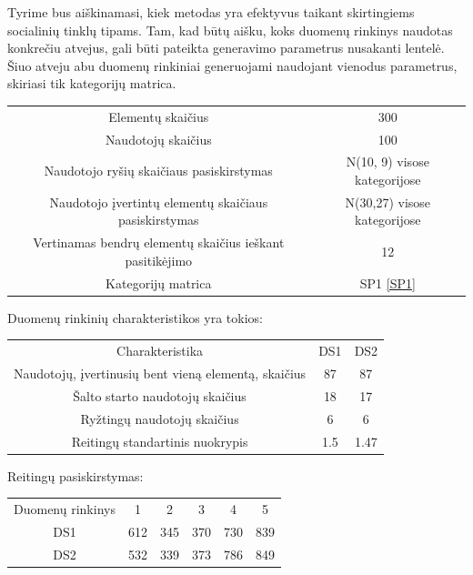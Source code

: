 \documentclass{VUMIFInfMagistrinis}
\begin{document}
Tyrime bus aiškinamasi, kiek metodas yra efektyvus taikant skirtingiems socialinių tinklų tipams. Tam, kad būtų aišku, koks duomenų rinkinys naudotas konkrečiu atvejus, gali būti pateikta generavimo parametrus nusakanti lentelė. Šiuo atveju abu duomenų rinkiniai generuojami naudojant vienodus parametrus, skiriasi tik kategorijų matrica.
\begin{center}
	\begin{tabular}{||c c||} 
		Elementų skaičius & 300 \\
		Naudotojų skaičius & 100 \\
		Naudotojo ryšių skaičiaus pasiskirstymas &  N(10, 9) visose kategorijose \\
		Naudotojo įvertintų elementų skaičiaus pasiskirstymas & N(30,27) visose kategorijose\\
		Vertinamas bendrų elementų skaičius ieškant pasitikėjimo & 12 \\
		Kategorijų matrica & SP1 \ref{SP1} \\
	\end{tabular}
	\indent
Duomenų rinkinių charakteristikos yra tokios:
	\begin{center}
		\begin{tabular}{||c c c ||} 
			Charakteristika & DS1 & DS2 \\
			Naudotojų, įvertinusių bent vieną elementą, skaičius & 87 & 87 \\
			Šalto starto naudotojų skaičius & 18 & 17 \\
			Ryžtingų naudotojų skaičius  & 6& 6  \\
			Reitingų standartinis nuokrypis & 1.5& 1.47 \\
		\end{tabular}
	\end{center}
	Reitingų pasiskirstymas:
	\begin{center}
		\begin{tabular}{||c c c c c c||} 
			Duomenų rinkinys &1 & 2 & 3 & 4 & 5 \\
			DS1 & 612 & 345 & 370 & 730 & 839 \\
			DS2 & 532 & 339 & 373 & 786 & 849 \\
		\end{tabular}
	\end{center}
\end{center}
\end{document}

